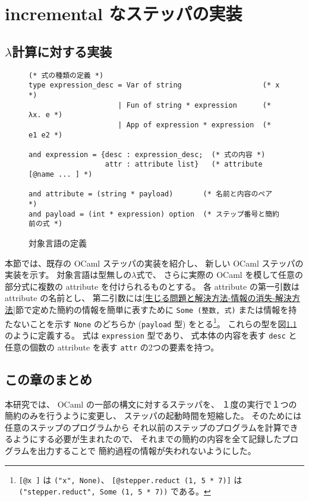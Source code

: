 \chapter{incremental なステッパの実装}
\label{chapter:incremental}







\section{$\lambda$計算に対する実装}

\begin{figure}
\begin{spacing}{0.8}
\begin{verbatim}
(* 式の種類の定義 *)
type expression_desc = Var of string                   (* x *)
                     | Fun of string * expression      (* λx. e *)
                     | App of expression * expression  (* e1 e2 *)
                              
and expression = {desc : expression_desc;  (* 式の内容 *)
                  attr : attribute list}   (* attribute [@name ... ] *)

and attribute = (string * payload)       (* 名前と内容のペア *)
and payload = (int * expression) option  (* ステップ番号と簡約前の式 *)
\end{verbatim}
\end{spacing}
\caption{対象言語の定義}
\label{figure:lambda_with_attrributes}
\end{figure}

本節では、既存の OCaml ステッパ\cite{FCA19}の実装を紹介し、
新しい OCaml ステッパの実装を示す。
対象言語は型無しの$\lambda$式で、
さらに実際の OCaml を模して任意の部分式に複数の attribute を付けられるものとする。
各 attribute の第一引数は attribute の名前とし、
第二引数には\ref{生じる問題と解決方法-情報の消失-解決方法}節で定めた簡約の情報を簡単に表すために
\texttt{Some (整数, 式)} または情報を持たないことを示す \texttt{None} のどちらか
(\texttt{payload} 型)
をとる\footnote{\texttt{[@x ]} は \texttt{("x", None)}、
\texttt{[@stepper.reduct (1, 5 * 7)]} は
\texttt{("stepper.reduct", Some (1, 5 * 7))} である。}。
これらの型を図\ref{figure:lambda_with_attrributes}のように定義する。
式は \texttt{expression} 型であり、
式本体の内容を表す \texttt{desc} と任意の個数の attribute を表す \texttt{attr} の2つの要素を持つ。











\section{この章のまとめ}

本研究では、
OCaml の一部の構文に対するステッパを、
１度の実行で１つの簡約のみを行うように変更し、
ステッパの起動時間を短縮した。
そのためには任意のステップのプログラムから
それ以前のステップのプログラムを計算できるようにする必要が生まれたので、
それまでの簡約の内容を全て記録したプログラムを出力することで
簡約過程の情報が失われないようにした。
